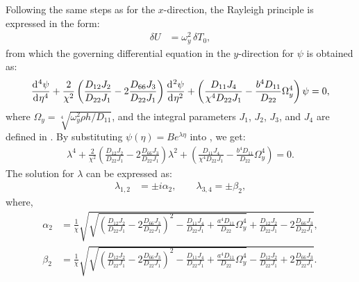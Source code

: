 \documentclass[preprint,12pt,number]{elsarticle}
\newcommand{\id}{\mathrm{d}\mkern1mu}
\begin{document}
Following the same steps as for the \(x\)-direction, the Rayleigh principle is expressed in the form:  
%
\begin{equation}\label{eq:Rayleighy}
	\begin{split}
		\delta U &= \omega_y^2 \, \delta T_0,
	\end{split}
\end{equation}
%
from which the governing differential equation in the $y$-direction for $\psi$ is obtained as:
%
\begin{equation}\label{eq:ODEy}
	\frac{\id^4 \psi}{\id \eta^4} + \frac{2}{\chi^2}\left(\frac{D_{12}J_2}{D_{22}J_1} - 2\frac{D_{66}J_3}{D_{22}J_1}\right)\frac{\id^2 \psi}{\id \eta^2} + \left( \frac{D_{11}J_4}{\chi^4D_{22}J_1} - \frac{b^4D_{11}}{D_{22}} \Omega_y^4 \right) \psi = 0,
\end{equation}
%
where $\Omega_y = \sqrt[4]{{\omega_y^2 \rho h}/D_{11}}$, and the integral parameters $J_1$, $J_2$, $J_3$, and $J_4$ are defined in .
By substituting $\psi(\eta) = B e^{\lambda \eta}$ into , we get:
%
\begin{equation}\label{eq:ODEy2}
\begin{split}
	\lambda^4 + \frac{2}{\chi^2} \left( \frac{D_{12}J_2}{D_{22}J_1} - 2\frac{D_{66}J_3}{D_{22}J_1} \right) \lambda^2 + \left( \frac{D_{11}J_4}{\chi^4D_{22}J_1} - \frac{b^4D_{11}}{D_{22}} \Omega_y^4 \right) = 0.
\end{split}
\end{equation}
%
The solution for $\lambda$ can be expressed as:
%
\begin{equation}\label{eq:lambda}
\begin{split}
	\lambda_{1,2} &= \pm \textit{i} \alpha_2, \qquad \lambda_{3,4} = \pm \beta_2,
\end{split}
\end{equation}
%
where,
%
\begin{subequations}\label{eq:beta}
\begin{align}
	\alpha_2 &= \frac{1}{\chi} \sqrt{ \sqrt{ \left( \frac{D_{12}J_2}{D_{22}J_1} - 2\frac{D_{66}J_3}{D_{22}J_1} \right)^2 - \frac{D_{11}J_4}{D_{22}J_1} + \frac{a^4 D_{11}}{D_{22}} \Omega_y^4 } + \frac{D_{12}J_2}{D_{22}J_1} - 2 \frac{D_{66}J_3}{D_{22}J_1}}, \label{eq:betay1}\\
	\beta_2 &= \frac{1}{\chi} \sqrt{ \sqrt{ \left( \frac{D_{12}J_2}{D_{22}J_1} - 2 \frac{D_{66}J_3}{D_{22}J_1} \right)^2 - \frac{D_{11}J_4}{D_{22}J_1} + \frac{a^4 D_{11}}{D_{22}} \Omega_y^4 } - \frac{D_{12}J_2}{D_{22}J_1} + 2 \frac{D_{66}J_3}{D_{22}J_1}}.\label{eq:betay2}
\end{align}
\end{subequations}
\end{document}
